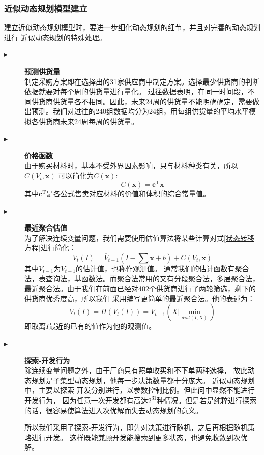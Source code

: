 \documentclass[withoutpreface,bwprint]{cumcmthesis}
\begin{document}
\subsubsection*{近似动态规划模型建立}
建立近似动态规划模型时，要进一步细化动态规划的细节，并且对完善的动态规划进行
近似动态规划的特殊处理。
\begin{description}
    \item[$\blacktriangleright$] \textbf{预测供货量} \\
        制定采购方案即在选择出的31家供应商中制定方案。选择最少供货商的判断依据就要对每个周的供货量进行量化。
        过往数据表明，在同一时间段，不同供货商供货量各不相同。因此，未来24周的供货量不能明确确定，需要做出预测。我们对过往的240组数据均分为24组，用每组供货量的平均水平模拟各供货商未来24周每周的供货量。
    \item[$\blacktriangleright$] \textbf{价格函数} \\
        由于购买材料时，基本不受外界因素影响，只与材料种类有关，所以$C(V_t,\bm{x})$
        可以简化为$C(\bm{x})$:
        $$
            C(\bm{x}) = \bm{c}^{\text{T}}\bm{x}
        $$
        其中$\bm{c}^{\text{T}}$是各公式售卖对应材料的价值和体积的综合常量值。
    \item[$\blacktriangleright$] \textbf{最近聚合估值} \\
        为了解决连续变量问题，我们需要使用估值算法将某些计算对式\ref{状态转移方程}进行简化：
        $$
            V_t(I) = \overline{ V }_{t-1} (I - \sum \bm{x} + b) + C(V_t,\bm{x})
        $$
        其中$\overline{V}_{t-1}$为$V_{t-1}$的估计值，也称作观测值。
        通常我们的估计函数有聚合法，表查询法，基函数法。而聚合法常用的又有分段聚合法，多层聚合法，
        最近聚合法。由于我们在前面已经对402个供货商进行了两轮筛选，剩下的供货商优秀度高，所以我们
        采用编写更简单的最近聚合法。他的表述为：
        $$
            \overline{V}_t(I) = H(V_t(I)) = V_{t-1}(\left. X \right| \min_{dist(I,X)})
        $$
        即取离$I$最近的已有的值作为他的观测值。
    \item[$\blacktriangleright$] \textbf{探索-开发行为} \\
        除连续变量问题之外，由于厂商只有照单收买和不下单两种选择，
        故此动态规划是子集型动态规划，他每一步决策数量都十分庞大。
        近似动态规划中，主要以探索-开发分别进行，以参数控制比例。但此问中显然不能进行开发行为，
        因为任意一次开发都有高达$2^{31}$种情况。但是若是纯粹进行探索
        的话，很容易使算法进入次优解而失去动态规划的意义。\par
        所以我们采用了探索-开发行为，即先对决策进行随机，之后再根据随机策略进行开发。
        这样既能兼顾开发能搜索到更多状态，也避免收敛到次优解。
\end{description}
\end{document}
